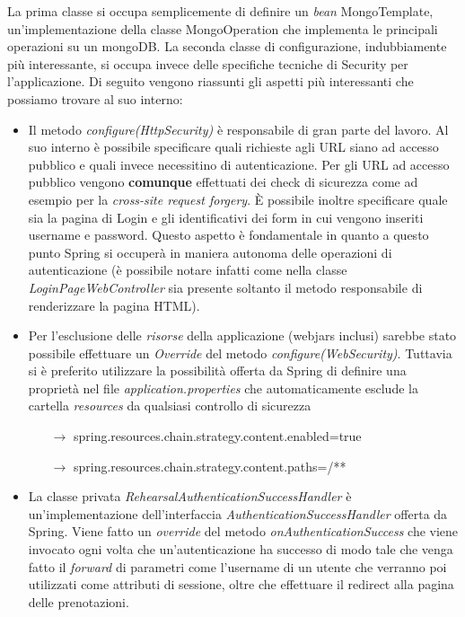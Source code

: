 La prima classe si occupa semplicemente di definire un \textsl{bean} MongoTemplate, un'implementazione della classe MongoOperation che implementa le principali operazioni su un mongoDB.\newline
La seconda classe di configurazione, indubbiamente più interessante, si occupa invece delle specifiche tecniche di Security per l'applicazione. Di seguito vengono riassunti gli aspetti più interessanti che possiamo trovare al suo interno:
\begin{itemize}
	\item Il metodo \textsl{configure(HttpSecurity)} è responsabile di gran parte del lavoro. Al suo interno è possibile specificare quali richieste agli URL siano ad accesso pubblico e quali invece necessitino di autenticazione. Per gli URL ad accesso pubblico vengono \textbf{comunque} effettuati dei check di sicurezza come ad esempio per la \textsl{cross-site request forgery}. È possibile inoltre specificare quale sia la pagina di Login e gli identificativi dei form in cui vengono inseriti username e password. Questo aspetto è fondamentale in quanto a questo punto Spring si occuperà in maniera autonoma delle operazioni di autenticazione (è possibile notare infatti come nella classe \textsl{LoginPageWebController} sia presente soltanto il metodo responsabile di renderizzare la pagina HTML).
	\item Per l'esclusione delle \textsl{risorse} della applicazione (webjars inclusi) sarebbe stato possibile effettuare un \textsl{Override} del metodo \textsl{configure(WebSecurity)}. Tuttavia si è preferito utilizzare la possibilità offerta da Spring di definire una proprietà nel file \textsl{application.properties} che automaticamente esclude la cartella \textsl{resources} da qualsiasi controllo di sicurezza
	\begin{itemize}
		\item[$\rightarrow$] spring.resources.chain.strategy.content.enabled=true
		\item[$\rightarrow$] spring.resources.chain.strategy.content.paths=/**
	\end{itemize}
	\item La classe privata \textsl{RehearsalAuthenticationSuccessHandler} è un'implementazione dell'interfaccia \textsl{AuthenticationSuccessHandler} offerta da Spring. Viene fatto un \textsl{override} del metodo \textsl{onAuthenticationSuccess} che viene invocato ogni volta che un'autenticazione ha successo di modo tale che venga fatto il \textsl{forward} di parametri come l'username di un utente che verranno poi utilizzati come attributi di sessione, oltre che effettuare il redirect alla pagina delle prenotazioni.
\end{itemize}

